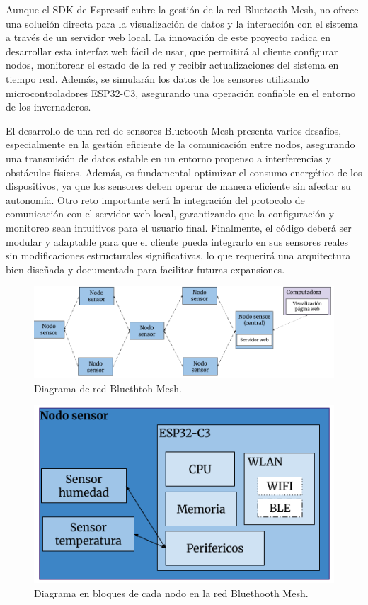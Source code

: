 \documentclass[
11pt, %
]{charter}
\begin{document}
Aunque el SDK de Espressif cubre la gestión de la red Bluetooth Mesh, no ofrece una solución directa para la visualización de datos y la interacción con el sistema a través de un servidor web local. La innovación de este proyecto radica en desarrollar esta interfaz web fácil de usar, que permitirá al cliente configurar nodos, monitorear el estado de la red y recibir actualizaciones del sistema en tiempo real. Además, se simularán los datos de los sensores utilizando microcontroladores ESP32-C3, asegurando una operación confiable en el entorno de los invernaderos.

El desarrollo de una red de sensores Bluetooth Mesh presenta varios desafíos, especialmente en la gestión eficiente de la comunicación entre nodos, asegurando una transmisión de datos estable en un entorno propenso a interferencias y obstáculos físicos. Además, es fundamental optimizar el consumo energético de los dispositivos, ya que los sensores deben operar de manera eficiente sin afectar su autonomía. Otro reto importante será la integración del protocolo de comunicación con el servidor web local, garantizando que la configuración y monitoreo sean intuitivos para el usuario final. Finalmente, el código deberá ser modular y adaptable para que el cliente pueda integrarlo en sus sensores reales sin modificaciones estructurales significativas, lo que requerirá una arquitectura bien diseñada y documentada para facilitar futuras expansiones.

\begin{figure}[htpb]
\centering 
\includegraphics[width=.95\textwidth]{./Figuras/Diagrama-ble-mesh.png}
\caption{Diagrama de red Bluethtoh Mesh.}
\label{fig:diagBloquesBleMesh}
\end{figure}

\begin{figure}[htpb]
\centering 
\includegraphics[width=.42\textwidth]{./Figuras/Diagrama-esp32-c3.png}
\caption{Diagrama en bloques de cada nodo en la red Bluethooth Mesh.}
\label{fig:diagBloquesEsp32}
\end{figure}
\end{document}
